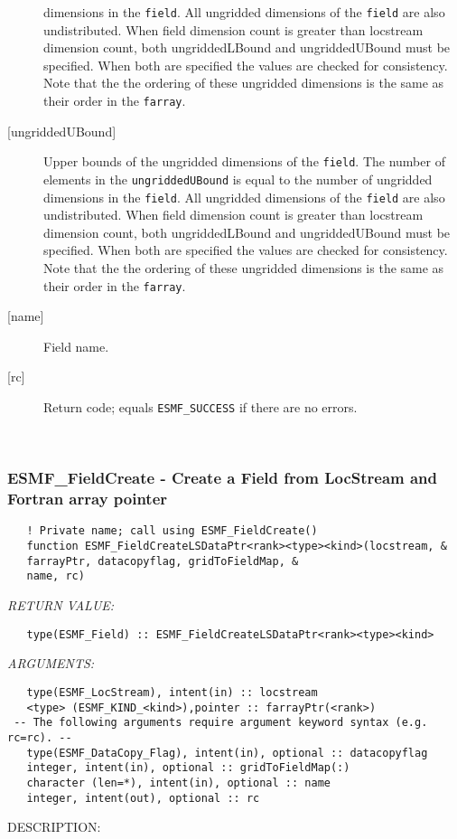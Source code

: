 \begin{description}
   dimensions in the {\tt field}. All ungridded dimensions of the 
   {\tt field} are also undistributed. When field dimension count is 
   greater than locstream dimension count, both ungriddedLBound and ungriddedUBound 
   must be specified. When both are specified the values are checked 
   for consistency. Note that the the ordering of 
   these ungridded dimensions is the same as their order in the {\tt farray}. 
   \item [{[ungriddedUBound]}] 
   Upper bounds of the ungridded dimensions of the {\tt field}. 
   The number of elements in the {\tt ungriddedUBound} is equal to the number of ungridded 
   dimensions in the {\tt field}. All ungridded dimensions of the 
   {\tt field} are also undistributed. When field dimension count is 
   greater than locstream dimension count, both ungriddedLBound and ungriddedUBound 
   must be specified. When both are specified the values are checked 
   for consistency. Note that the the ordering of 
   these ungridded dimensions is the same as their order in the {\tt farray}. 
   \item [{[name]}] 
   Field name. 
   \item [{[rc]}] 
   Return code; equals {\tt ESMF\_SUCCESS} if there are no errors. 
   \end{description} 
    
 
\mbox{}\hrulefill\ 
 
\subsubsection [ESMF\_FieldCreate] {ESMF\_FieldCreate - Create a Field from LocStream and Fortran array pointer }


   
\begin{verbatim}   ! Private name; call using ESMF_FieldCreate() 
   function ESMF_FieldCreateLSDataPtr<rank><type><kind>(locstream, & 
   farrayPtr, datacopyflag, gridToFieldMap, & 
   name, rc) 
   \end{verbatim}{\em RETURN VALUE:}
\begin{verbatim}   type(ESMF_Field) :: ESMF_FieldCreateLSDataPtr<rank><type><kind> 
   \end{verbatim}{\em ARGUMENTS:}
\begin{verbatim}   type(ESMF_LocStream), intent(in) :: locstream 
   <type> (ESMF_KIND_<kind>),pointer :: farrayPtr(<rank>) 
 -- The following arguments require argument keyword syntax (e.g. rc=rc). --
   type(ESMF_DataCopy_Flag), intent(in), optional :: datacopyflag 
   integer, intent(in), optional :: gridToFieldMap(:) 
   character (len=*), intent(in), optional :: name 
   integer, intent(out), optional :: rc 
   \end{verbatim}
{\sf DESCRIPTION:\\ }

